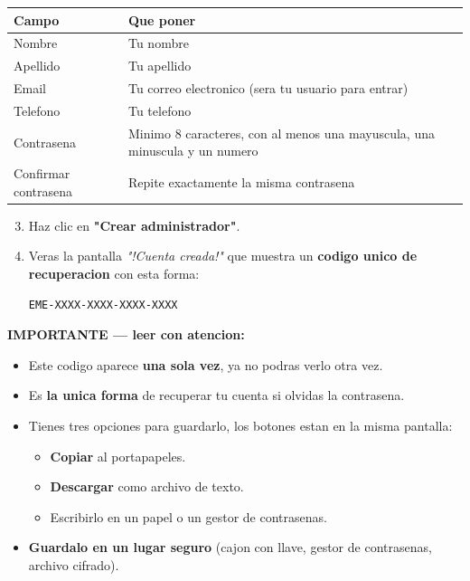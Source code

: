 \documentclass[11pt,a4paper]{article}
\begin{document}
\begin{center}
    \begin{tabular}{|L{3.5cm}|L{9cm}|}
        \hline
        \textbf{Campo}       & \textbf{Que poner}                                                         \\
        \hline
        Nombre               & Tu nombre                                                                  \\
        \hline
        Apellido             & Tu apellido                                                                \\
        \hline
        Email                & Tu correo electronico (sera tu usuario para entrar)                        \\
        \hline
        Telefono             & Tu telefono                                                                \\
        \hline
        Contrasena           & Minimo 8 caracteres, con al menos una mayuscula, una minuscula y un numero \\
        \hline
        Confirmar contrasena & Repite exactamente la misma contrasena                                     \\
        \hline
    \end{tabular}
\end{center}

\begin{enumerate}
    \setcounter{enumi}{2}
    \item Haz clic en \textbf{"Crear administrador"}.
    \item Veras la pantalla \textit{"!Cuenta creada!"} que muestra un \textbf{codigo unico de recuperacion} con esta forma:
          \begin{lstlisting}
EME-XXXX-XXXX-XXXX-XXXX
\end{lstlisting}
\end{enumerate}

\begin{cajaCritica}
    \textbf{IMPORTANTE --- leer con atencion:}
    \begin{itemize}
        \item Este codigo aparece \textbf{una sola vez}, ya no podras verlo otra vez.
        \item Es \textbf{la unica forma} de recuperar tu cuenta si olvidas la contrasena.
        \item Tienes tres opciones para guardarlo, los botones estan en la misma pantalla:
              \begin{itemize}
                  \item \textbf{Copiar} al portapapeles.
                  \item \textbf{Descargar} como archivo de texto.
                  \item Escribirlo en un papel o un gestor de contrasenas.
              \end{itemize}
        \item \textbf{Guardalo en un lugar seguro} (cajon con llave, gestor de contrasenas, archivo cifrado).
    \end{itemize}
\end{cajaCritica}
\end{document}

